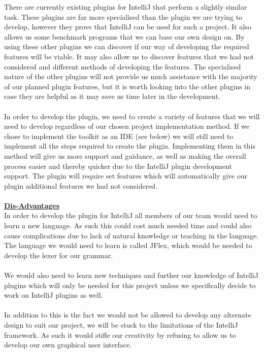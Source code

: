 \documentclass{l3proj}
\begin{document}
 There are currently existing plugins for IntelliJ that perform a slightly similar task.  These plugins are far more specialised than the plugin we are trying to develop, however they prove that IntelliJ can be used for such a project. It also allows us some benchmark programs that we can base our own design on. By using these other plugins we can discover if our way of developing the required features will be viable. It may also allow us to discover features that we had not considered and different methods of developing the features. The specialised nature of the other plugins will not provide us much assistance with the majority of our planned plugin features, but it is worth looking into the other plugins in case they are helpful as it may save us time later in the development.\\
 \\
 In order to develop the plugin, we need to create a variety of features that we will need to develop regardless of our chosen project implementation method. If we chose to implement the toolkit as an IDE (see below) we will still need to implement all the steps required to create the plugin. Implementing them in this method will give us more support and guidance, as well as making the overall process easier and thereby quicker due to the IntelliJ plugin development support. The plugin will require set features which will automatically give our plugin additional features we had not considered. \\
 \\
 \textbf {\underline{Dis-Advantages}}\\
In order to develop the plugin for IntelliJ all members of our team would need to learn a new language. As such this could cost much needed time and could also cause complications due to lack of natural knowledge or teaching in the language. The language we would need to learn is called JFlex, which would be needed to develop the lexer for our grammar.\\
\\
We would also need to learn new techniques and further our knowledge of IntelliJ plugins which will only be needed for this project unless we specifically decide to work on IntelliJ plugins as well.\\
\\ 
In addition to this is the fact we would not be allowed to develop any alternate design to suit our project, we will be stuck to the limitations of the IntelliJ framework. As such it would stifle our creativity by refusing to allow us to develop our own graphical user interface. \\
\end{document}
